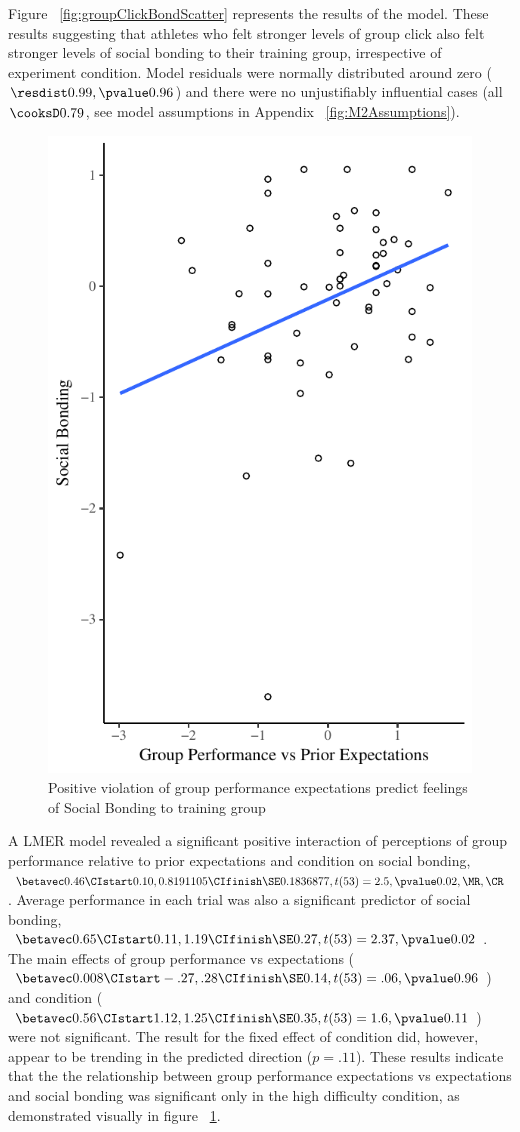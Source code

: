 Figure ~\ref{fig:groupClickBondScatter} represents the results of the model.  These results suggesting that athletes who felt stronger levels of group click also felt stronger levels of social bonding to their training group, irrespective of experiment condition.  Model residuals were normally distributed around zero ($\resdist 0.99, \pvalue 0.96$) and there were no unjustifiably influential cases (all $\cooksD 0.79$, see model assumptions in Appendix ~\ref{fig:M2Assumptions}).








\begin{figure}
  \centering
  \includegraphics[width=0.5\linewidth,keepaspectratio] {images/groupPerfExpBondConditionScatter}
  \caption{Positive violation of group performance expectations
 predict feelings of Social Bonding to training group}
 \label{fig:groupPerfExpBondConditionScatter}
\end{figure}

A LMER model revealed a significant positive interaction of perceptions of group performance relative to prior expectations and condition on social bonding, $\betavec 0.46 \CIstart 0.10, 0.8191105 \CIfinish \SE 0.1836877, t(53) = 2.5, \pvalue 0.02, \MR , \CR $.  Average performance in each trial was also a significant predictor of social bonding, $\betavec 0.65 \CIstart 0.11, 1.19 \CIfinish \SE 0.27, t(53) = 2.37, \pvalue 0.02$.
The main effects of group performance vs expectations ($\betavec 0.008 \CIstart -.27, .28 \CIfinish \SE 0.14, t(53) = .06, \pvalue 0.96$) and condition ($\betavec 0.56 \CIstart 1.12, 1.25 \CIfinish \SE 0.35, t(53) = 1.6, \pvalue 0.11$) were not significant. The result for the fixed effect of condition did, however, appear to be trending in the predicted direction ($p = .11$). These results indicate that the the relationship between group performance expectations vs expectations and social bonding was significant only in the high difficulty condition, as demonstrated visually in figure ~\ref{fig:groupPerfExpBondConditionScatter}.

